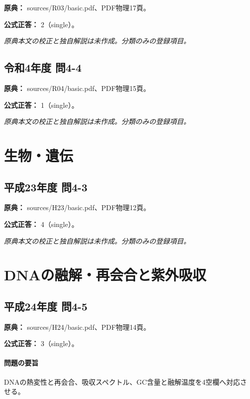 \noindent\textbf{原典：} sources/R03/basic.pdf、PDF物理17頁。

\textbf{公式正答：} 2（single）。

\par\textit{原典本文の校正と独自解説は未作成。分類のみの登録項目。}

\subsection{令和4年度 問4-4}
\label{q:r04-reg-basic-4-4}

\noindent\textbf{原典：} sources/R04/basic.pdf、PDF物理15頁。

\textbf{公式正答：} 1（single）。

\par\textit{原典本文の校正と独自解説は未作成。分類のみの登録項目。}

\section{生物・遺伝}

\subsection{平成23年度 問4-3}
\label{q:h23-reg-basic-4-3}

\noindent\textbf{原典：} sources/H23/basic.pdf、PDF物理12頁。

\textbf{公式正答：} 4（single）。

\par\textit{原典本文の校正と独自解説は未作成。分類のみの登録項目。}

\section{DNAの融解・再会合と紫外吸収}

\subsection{平成24年度 問4-5}
\label{q:h24-reg-basic-4-5}

\noindent\textbf{原典：} sources/H24/basic.pdf、PDF物理14頁。

\textbf{公式正答：} 3（single）。

\paragraph{問題の要旨} DNAの熱変性と再会合、吸収スペクトル、GC含量と融解温度を4空欄へ対応させる。

